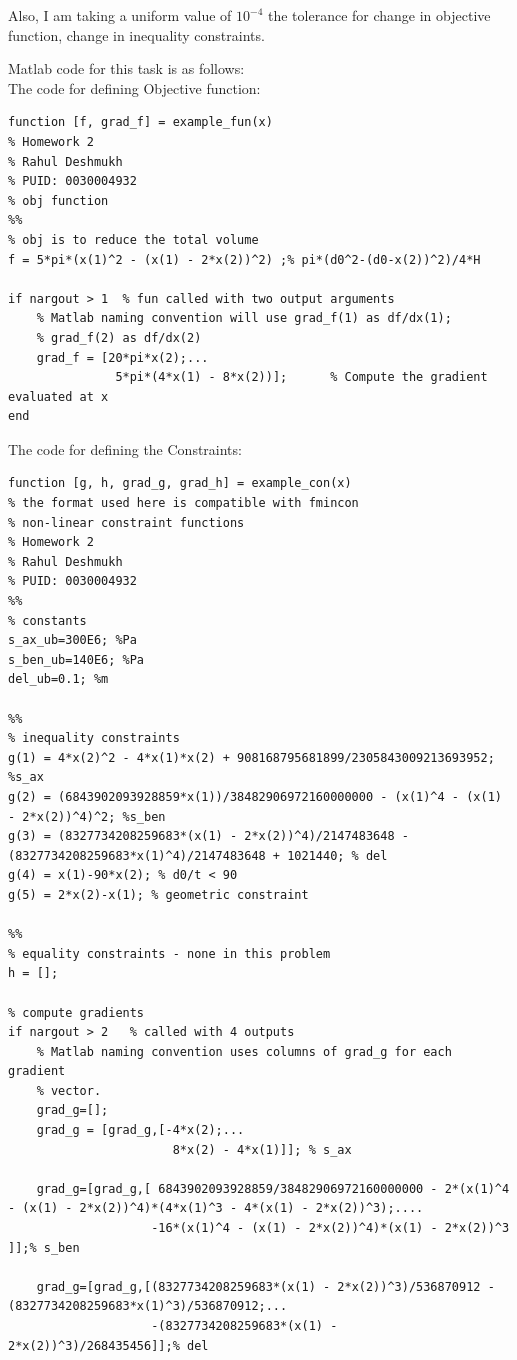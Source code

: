\documentclass[12pt]{article}
\begin{document}
\begin{enumerate}[I]
\begin{enumerate}[1)]
Also, I am taking a uniform value of $10^{-4}$ the tolerance for change in objective function, change in inequality constraints. 

Matlab code for this task is as follows:\\

The code for defining Objective function:
\begin{lstlisting}
function [f, grad_f] = example_fun(x)
% Homework 2 
% Rahul Deshmukh
% PUID: 0030004932
% obj function 
%%
% obj is to reduce the total volume
f = 5*pi*(x(1)^2 - (x(1) - 2*x(2))^2) ;% pi*(d0^2-(d0-x(2))^2)/4*H    

if nargout > 1  % fun called with two output arguments
    % Matlab naming convention will use grad_f(1) as df/dx(1); 
    % grad_f(2) as df/dx(2)
    grad_f = [20*pi*x(2);... 
               5*pi*(4*x(1) - 8*x(2))];      % Compute the gradient evaluated at x
end
\end{lstlisting}

The code for defining the Constraints:
\begin{lstlisting}
function [g, h, grad_g, grad_h] = example_con(x)
% the format used here is compatible with fmincon
% non-linear constraint functions 
% Homework 2 
% Rahul Deshmukh
% PUID: 0030004932
%%
% constants
s_ax_ub=300E6; %Pa
s_ben_ub=140E6; %Pa
del_ub=0.1; %m

%%
% inequality constraints
g(1) = 4*x(2)^2 - 4*x(1)*x(2) + 908168795681899/2305843009213693952; %s_ax
g(2) = (6843902093928859*x(1))/38482906972160000000 - (x(1)^4 - (x(1) - 2*x(2))^4)^2; %s_ben
g(3) = (8327734208259683*(x(1) - 2*x(2))^4)/2147483648 - (8327734208259683*x(1)^4)/2147483648 + 1021440; % del
g(4) = x(1)-90*x(2); % d0/t < 90
g(5) = 2*x(2)-x(1); % geometric constraint

%%
% equality constraints - none in this problem
h = [];

% compute gradients
if nargout > 2   % called with 4 outputs
    % Matlab naming convention uses columns of grad_g for each gradient
    % vector. 
    grad_g=[];
    grad_g = [grad_g,[-4*x(2);...
                       8*x(2) - 4*x(1)]]; % s_ax
                  
    grad_g=[grad_g,[ 6843902093928859/38482906972160000000 - 2*(x(1)^4 - (x(1) - 2*x(2))^4)*(4*x(1)^3 - 4*(x(1) - 2*x(2))^3);....
                    -16*(x(1)^4 - (x(1) - 2*x(2))^4)*(x(1) - 2*x(2))^3 ]];% s_ben       
               
    grad_g=[grad_g,[(8327734208259683*(x(1) - 2*x(2))^3)/536870912 - (8327734208259683*x(1)^3)/536870912;...
                    -(8327734208259683*(x(1) - 2*x(2))^3)/268435456]];% del            
                 

\end{lstlisting}
\end{enumerate}
\end{enumerate}
\end{document}
